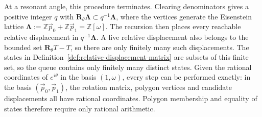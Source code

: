 \documentclass[scheme=plain]{ctexart}
\begin{document}
At a resonant angle, this procedure terminates.
Clearing denominators gives a positive
integer $q$ with $\mathbf R_\theta\boldsymbol\Lambda\subset q^{-1}\boldsymbol\Lambda$, where the vertices generate the Eisenstein lattice $\boldsymbol{\Lambda}:=\mathbb Z\vec p_0+\mathbb Z\vec p_1=\mathbb Z[\omega]$.
The recursion then places every reachable relative displacement in
$q^{-1}\boldsymbol\Lambda$. A live relative displacement also belongs to the
bounded set $\mathbf R_\theta T-T$, so there are only finitely many such
displacements. The states in Definition~\ref{def:relative-displacement-matrix}
are subsets of this finite set, so the queue contains only finitely many distinct states.
Given the rational coordinates of $e^{i\theta}$ in the basis $(1,\omega)$, every step can be performed exactly: in the basis $(\vec p_0,\vec p_1)$, the rotation matrix, polygon vertices and candidate displacements all have rational coordinates.
Polygon membership and equality of states therefore require only rational arithmetic.
\end{document}
